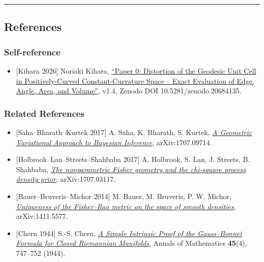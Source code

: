 \documentclass[
]{ltjsarticle}
\providecommand{\tightlist}{%
  \setlength{\itemsep}{0pt}\setlength{\parskip}{0pt}}
\begin{document}
\begin{center}\rule{0.5\linewidth}{0.5pt}\end{center}

\subsection{References}\label{references}

\subsubsection{Self-reference}\label{self-reference}

\begin{itemize}
\tightlist
\item
  {[}Kihara 2026{]} Noriaki Kihara,
  \href{../波長空間と周波数空間の双対幾何/paper0_geodesic_cell_distortion_en_v1_4.md}{``Paper
  0: Distortion of the Geodesic Unit Cell in Positively-Curved
  Constant-Curvature Space -- Exact Evaluation of Edge, Angle, Area, and
  Volume''}, v1.4, Zenodo DOI 10.5281/zenodo.20684135.
\end{itemize}

\subsubsection{Related References}\label{related-references}

\begin{itemize}
\tightlist
\item
  {[}Saha--Bharath--Kurtek 2017{]} A. Saha, K. Bharath, S. Kurtek,
  \href{https://arxiv.org/abs/1707.09714}{\emph{A Geometric Variational
  Approach to Bayesian Inference}}, arXiv:1707.09714.
\item
  {[}Holbrook--Lan--Streets--Shahbaba 2017{]} A. Holbrook, S. Lan, J.
  Streets, B. Shahbaba,
  \href{https://arxiv.org/abs/1707.03117}{\emph{The nonparametric Fisher
  geometry and the chi-square process density prior}}, arXiv:1707.03117.
\item
  {[}Bauer--Bruveris--Michor 2014{]} M. Bauer, M. Bruveris, P. W.
  Michor, \href{https://arxiv.org/abs/1411.5577}{\emph{Uniqueness of the
  Fisher--Rao metric on the space of smooth densities}},
  arXiv:1411.5577.
\item
  {[}Chern 1944{]} S.-S. Chern,
  \href{https://doi.org/10.2307/1969302}{\emph{A Simple Intrinsic Proof
  of the Gauss--Bonnet Formula for Closed Riemannian Manifolds}}, Annals
  of Mathematics \textbf{45}(4), 747--752 (1944).
\end{itemize}
\end{document}
